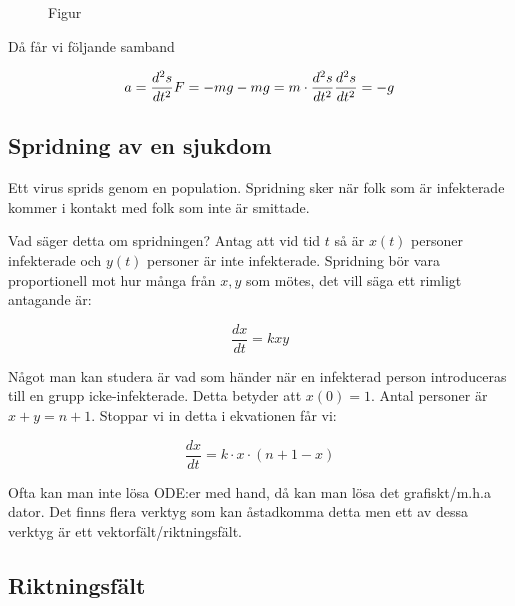\begin{figure}[ht]
    \centering
    \caption{Figur}
    \label{fig:figur}
\end{figure}
\par\bigskip

\noindent Då får vi följande samband

\begin{equation*}
  a = \dfrac{d^2s}{dt^2}\\
  F = -mg\\
  -mg=m\cdot\dfrac{d^2s}{dt^2}\\
  \dfrac{d^2s}{dt^2}=-g
\end{equation*}

\subsection{Spridning av en sjukdom}

\noindent Ett virus sprids genom en population. Spridning sker när folk som är infekterade kommer i kontakt med folk som inte är smittade.
\par\bigskip
 Vad säger detta om spridningen? Antag att vid tid $t$ så är $x(t)$ personer infekterade och $y(t)$ personer är inte infekterade. Spridning bör vara proportionell mot hur många från $x, y$ som mötes, det vill säga ett rimligt antagande är:
 \par\bigskip


 \begin{equation*}
   \dfrac{dx}{dt} = kxy
 \end{equation*}
 \par\bigskip

 \noindent Något man kan studera är vad som händer när en infekterad person introduceras till en grupp icke-infekterade. Detta betyder att $x(0)=1$. Antal personer är $x+y=n+1$. Stoppar vi in detta i ekvationen får vi:


 \begin{equation*}
   \dfrac{dx}{dt}= k\cdot x\cdot(n+1-x)
 \end{equation*}
 \par\bigskip

\noindent Ofta kan man inte lösa ODE:er med hand, då kan man lösa det grafiskt/m.h.a dator. Det finns flera verktyg som kan åstadkomma detta men ett av dessa verktyg är ett vektorfält/riktningsfält.

\subsection{Riktningsfält}
\par\bigskip

